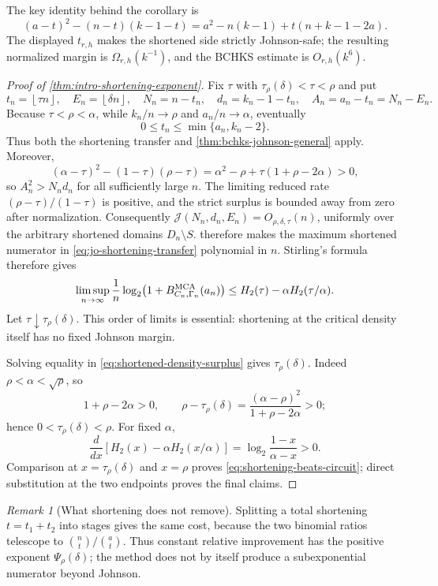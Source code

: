 \documentclass[11pt,a4paper]{amsart}
\numberwithin{equation}{section}
\theoremstyle{remark}
\newtheorem{remark}[remark]{Remark}
\newcommand{\Jcal}{\mathcal J}
\newcommand{\floor}[1]{\left\lfloor #1\right\rfloor}
\begin{document}
The key identity behind the corollary is
\[
 (a-t)^2-(n-t)(k-1-t)
 =a^2-n(k-1)+t(n+k-1-2a).                         \tag{SH5}
\]
The displayed \(t_{r,h}\) makes the shortened side strictly Johnson-safe;
the resulting normalized margin is \(\Omega_{r,h}(k^{-1})\), and the
BCHKS estimate is \(O_{r,h}(k^6)\).

\begin{proof}[Proof of \cref{thm:intro-shortening-exponent}]
Fix \(\tau\) with \(\tau_\rho(\delta)<\tau<\rho\) and put
\[
 t_n=\floor{\tau n},\quad E_n=\floor{\delta n},\quad
 N_n=n-t_n,\quad d_n=k_n-1-t_n,\quad
 A_n=a_n-t_n=N_n-E_n.
\]
Because \(\tau<\rho<\alpha\), while \(k_n/n\to\rho\) and
\(a_n/n\to\alpha\), eventually
\[
             0\le t_n\le\min\{a_n,k_n-2\}.          \tag{SH6}
\]
Thus both the shortening transfer and
\cref{thm:bchks-johnson-general} apply.  Moreover,
\[
 (\alpha-\tau)^2-(1-\tau)(\rho-\tau)
 =\alpha^2-\rho+\tau(1+\rho-2\alpha)>0,           \tag{SH9}
 \label{eq:shortened-density-surplus}
\]
so \(A_n^2>N_nd_n\) for all sufficiently large \(n\).  The limiting
reduced rate \((\rho-\tau)/(1-\tau)\) is positive, and the strict surplus
is bounded away from zero after normalization.  Consequently
\(\Jcal(N_n,d_n,E_n)=O_{\rho,\delta,\tau}(n)\), uniformly over the
arbitrary shortened domains \(D_n\setminus S\).
 therefore makes the maximum shortened
numerator in
\eqref{eq:jo-shortening-transfer} polynomial in \(n\).  Stirling's formula
therefore gives
\[
 \limsup_{n\to\infty}\frac1n\log_2
 \bigl(1+B_{C_n,\Gamma_n}^{\rm MCA}(a_n)\bigr)
 \le H_2(\tau)-\alpha H_2(\tau/\alpha).
\]
Let \(\tau\downarrow\tau_\rho(\delta)\).  This order of limits is
essential: shortening at the critical density itself has no fixed Johnson
margin.

Solving equality in \eqref{eq:shortened-density-surplus} gives
\(\tau_\rho(\delta)\).  Indeed \(\rho<\alpha<\sqrt\rho\), so
\[
 1+\rho-2\alpha>0,\qquad
 \rho-\tau_\rho(\delta)
 =\frac{(\alpha-\rho)^2}{1+\rho-2\alpha}>0;
\]
hence \(0<\tau_\rho(\delta)<\rho\).  For fixed \(\alpha\),
\[
 \frac{d}{dx}\left[H_2(x)-\alpha H_2(x/\alpha)\right]
 =\log_2\frac{1-x}{\alpha-x}>0.
\]
Comparison at \(x=\tau_\rho(\delta)\) and \(x=\rho\) proves
\eqref{eq:shortening-beats-circuit}; direct substitution at the two
endpoints proves the final
claims.
\end{proof}

\begin{remark}[What shortening does not remove]
Splitting a total shortening \(t=t_1+t_2\) into stages gives the same cost,
because the two binomial ratios telescope to
\(\binom nt/\binom at\).  Thus constant relative improvement has the
positive exponent \(\Psi_\rho(\delta)\); the method does not by itself
produce a subexponential numerator beyond Johnson.
\end{remark}
\end{document}
